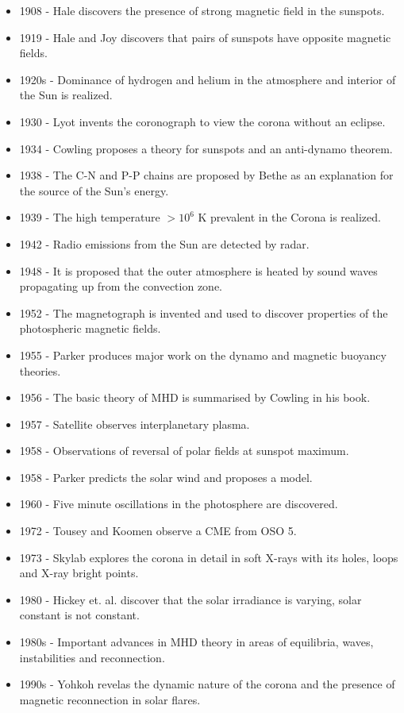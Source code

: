 \documentclass{../template/texnote}
\begin{document}
\begin{itemize}
	\item 1908 - Hale discovers the presence of strong magnetic field in the sunspots.
	\item 1919 - Hale and Joy discovers that pairs of sunspots have opposite magnetic fields.
	\item 1920s - Dominance of hydrogen and helium in the atmosphere and interior of the Sun is realized.
	\item 1930 - Lyot invents the coronograph to view the corona without an eclipse.
	\item 1934 - Cowling proposes a theory for sunspots and an anti-dynamo theorem.
	\item 1938 - The C-N and P-P chains are proposed by Bethe as an explanation for the source of the Sun’s energy.
	\item 1939 - The high temperature $>10^6$ K prevalent in the Corona is realized.
	\item 1942 - Radio emissions from the Sun are detected by radar.
	\item 1948 - It is proposed that the outer atmosphere is heated by sound waves propagating up from the convection zone.
	\item 1952 - The magnetograph is invented and used to discover properties of the photospheric magnetic fields.
	\item 1955 - Parker produces major work on the dynamo and magnetic buoyancy theories.
	\item 1956 - The basic theory of MHD is summarised by Cowling in his book.
	\item 1957 - Satellite observes interplanetary plasma.
	\item 1958 - Observations of reversal of polar fields at sunspot maximum.
	\item 1958 - Parker predicts the solar wind and proposes a model.
	\item 1960 - Five minute oscillations in the photosphere are discovered.
	\item 1972 - Tousey and Koomen observe a CME from OSO 5.
	\item 1973 - Skylab explores the corona in detail in soft X-rays with its holes, loops and X-ray bright points.
	\item 1980 - Hickey et. al. discover that the solar irradiance is varying, solar constant is not constant.
	\item 1980s - Important advances in MHD theory in areas of equilibria, waves, instabilities and reconnection.
	\item 1990s - Yohkoh revelas the dynamic nature of the corona and the presence of magnetic reconnection in solar flares.

\end{itemize}
\end{document}
